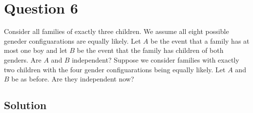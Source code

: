 \section*{Question 6}

Consider all families of exactly three children.
We assume all eight possible geneder configuarations are equally likely.
Let \( A \) be the event that a family has at most one boy and let \( B \) be the event that the family has children of both genders.
Are \( A \) and \( B \) independent?
Suppose we consider families with exactly two children with the four gender configuarations being equally likely.
Let \( A \) and \( B \) be as before.
Are they independent now?

\subsection*{Solution}

